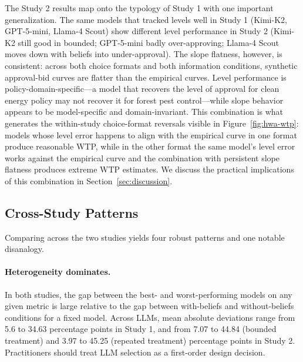 \documentclass[12pt]{article}
\begin{document}
The Study 2 results map onto the typology of Study 1 with one important
generalization. The same models that tracked levels well in Study 1
(Kimi-K2, GPT-5-mini, Llama-4 Scout) show different level performance
in Study 2 (Kimi-K2 still good in bounded; GPT-5-mini badly
over-approving; Llama-4 Scout moves down with beliefs into
under-approval). The slope flatness, however, is consistent: across
both choice formats and both information conditions, synthetic
approval-bid curves are flatter than the empirical curves. Level
performance is policy-domain-specific---a model that recovers the level
of approval for clean energy policy may not recover it for forest
pest control---while slope behavior appears to be model-specific and
domain-invariant. This combination is what generates the within-study
choice-format reversals visible in Figure~\ref{fig:hwa-wtp}: models
whose level error happens to align with the empirical curve in one
format produce reasonable WTP, while in the other format the same
model's level error works against the empirical curve and the
combination with persistent slope flatness produces extreme WTP
estimates. We discuss the practical implications of this combination
in Section~\ref{sec:discussion}.

\subsection{Cross-Study Patterns}\label{sec:results-cross}

Comparing across the two studies yields four robust patterns and one
notable disanalogy.

\paragraph{Heterogeneity dominates.} In both studies, the gap between the
best- and worst-performing models on any given metric is large relative
to the gap between with-beliefs and without-beliefs conditions for a
fixed model. Across LLMs, mean absolute deviations range from 5.6 to 34.63 percentage points in Study 1, and from 7.07 to 44.84 (bounded treatment) and 3.97 to 45.25 (repeated treatment) percentage points in Study 2. Practitioners should treat LLM selection as a first-order design
decision.
\end{document}
